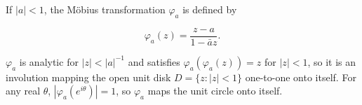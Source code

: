 If $|a| < 1$, the Möbius transformation $\varphi_a$ is defined by

$$\varphi_a(z) = \frac{z - a}{1 - \bar{a}z}.$$

$\varphi_a$ is analytic for $|z| < |a|^{-1}$ and satisfies $\varphi_a(\varphi_a(z)) = z$ for $|z| < 1$, so it is an involution mapping the open unit disk $D = \{z : |z| < 1\}$ one-to-one onto itself. For any real $\theta$, $|\varphi_a(e^{i\theta})| = 1$, so $\varphi_a$ maps the unit circle onto itself.
